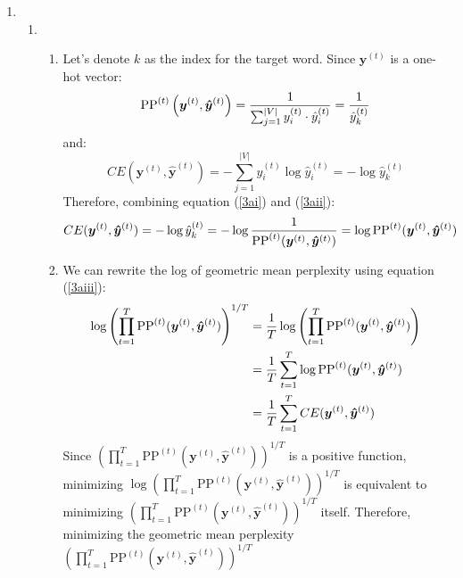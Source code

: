 \documentclass[10pt,reqno]{amsart}
\begin{document}
\begin{enumerate}[topsep=0pt,itemsep=3ex,partopsep=1ex,parsep=1ex]
\item
  \begin{enumerate}[itemsep=2ex]
  \item
    \begin{enumerate}[itemsep=2ex]
      \item Let's denote $k$ as the index for the target word. Since $\bm{y}^{(t)}$ is a 
        one-hot vector:
        \begin{equation}
          \text{PP}^{(t)}\left(\bm{y}^{(t)}, \bm{\hat{y}}^{(t)}\right) 
          = \frac{1}{\sum^{|V|}_{j=1} y^{(t)}_i \cdot \hat{y}^{(t)}_i}
          = \frac{1}{\hat{y}^{(t)}_k} \label{3ai}
        \end{equation}
        and:
        \begin{equation}
          CE(\bm{y}^{(t)}, \bm{\hat{y}}^{(t)})
          = - \sum^{|V|}_{j=1} y^{(t)}_i \log \hat{y}^{(t)}_i
          = - \log \hat{y}^{(t)}_k \label{3aii}
        \end{equation}
        Therefore, combining equation (\ref{3ai}) and (\ref{3aii}):
        \begin{equation}
          CE(\bm{y}^{(t)}, \bm{\hat{y}}^{(t)})
          = - \log \hat{y}^{(t)}_k
          = - \log \frac{1}{\text{PP}^{(t)}(\bm{y}^{(t)}, \bm{\hat{y}}^{(t)})}
          = \log \text{PP}^{(t)}(\bm{y}^{(t)}, \bm{\hat{y}}^{(t)}) \label{3aiii}
        \end{equation}
      \item
        We can rewrite the log of geometric mean perplexity using equation (\ref{3aiii}):
        \begin{align*}
          \log \left( \prod^T_{t=1} \text{PP}^{(t)}(\bm{y}^{(t)}, \bm{\hat{y}}^{(t)}) \right)^{1/T}
          &= \frac{1}{T} \log \left( \prod^T_{t=1} \text{PP}^{(t)}(\bm{y}^{(t)}, \bm{\hat{y}}^{(t)}) \right) \\
          &= \frac{1}{T} \sum^T_{t=1} \log \text{PP}^{(t)}(\bm{y}^{(t)}, \bm{\hat{y}}^{(t)}) \\
          &= \frac{1}{T} \sum^T_{t=1} CE(\bm{y}^{(t)}, \bm{\hat{y}}^{(t)})
        \end{align*}
        Since $\left( \prod^T_{t=1} \text{PP}^{(t)}(\bm{y}^{(t)}, \bm{\hat{y}}^{(t)}) \right)^{1/T}$ is 
        a positive function, minimizing $\log \left( \prod^T_{t=1} \text{PP}^{(t)}(\bm{y}^{(t)}, \bm{\hat{y}}^{(t)}) \right)^{1/T}$
        is equivalent to minimizing $\left( \prod^T_{t=1} \text{PP}^{(t)}(\bm{y}^{(t)}, \bm{\hat{y}}^{(t)}) \right)^{1/T}$ itself. 
        Therefore, minimizing the geometric mean perplexity $\left( \prod^T_{t=1} \text{PP}^{(t)}(\bm{y}^{(t)}, \bm{\hat{y}}^{(t)}) \right)^{1/T}$

\end{enumerate}
\end{enumerate}
\end{enumerate}
\end{document}
